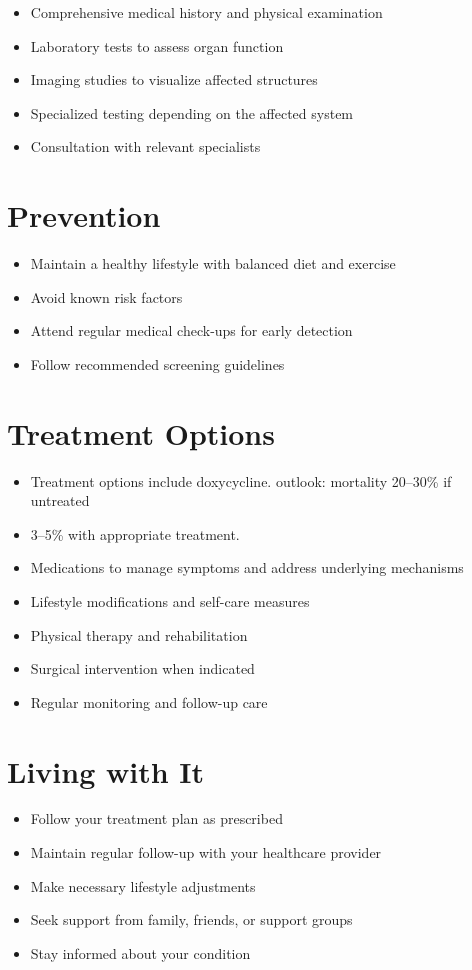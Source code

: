 \begin{itemize}[noitemsep]
  \item Comprehensive medical history and physical examination
  \item Laboratory tests to assess organ function
  \item Imaging studies to visualize affected structures
  \item Specialized testing depending on the affected system
  \item Consultation with relevant specialists
\end{itemize}
\section{Prevention}
\begin{itemize}[noitemsep]
  \item Maintain a healthy lifestyle with balanced diet and exercise
  \item Avoid known risk factors
  \item Attend regular medical check-ups for early detection
  \item Follow recommended screening guidelines
\end{itemize}
\section{Treatment Options}
\begin{itemize}[noitemsep]
  \item Treatment options include doxycycline. outlook: mortality 20--30\% if untreated
  \item 3--5\% with appropriate treatment.
  \item Medications to manage symptoms and address underlying mechanisms
  \item Lifestyle modifications and self-care measures
  \item Physical therapy and rehabilitation
  \item Surgical intervention when indicated
  \item Regular monitoring and follow-up care
\end{itemize}
\section{Living with It}
\begin{itemize}[noitemsep]
  \item Follow your treatment plan as prescribed
  \item Maintain regular follow-up with your healthcare provider
  \item Make necessary lifestyle adjustments
  \item Seek support from family, friends, or support groups
  \item Stay informed about your condition
\end{itemize}
